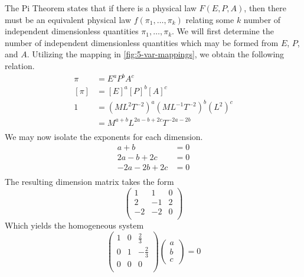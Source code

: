 \documentclass[12pt]{article}
\begin{document}
  The Pi Theorem states that if there is a physical law $F(E, P, A)$, then there
  must be an equivalent physical law $f(\pi_1, \ldots, \pi_k)$ relating some $k$
  number of independent dimensionless quantities $\pi_1,\ldots,\pi_k$. We will
  first determine the number of independent dimensionless quantities which may
  be formed from $E$, $P$, and $A$. Utilizing the mapping in
  \cref{fig:5-var-mappings}, we obtain the following relation.
  \begin{equation*}
    \begin{aligned}
      \pi &= {E}^a{P}^b{A}^c \\
      [\pi] &= {[E]}^a{[P]}^b{[A]}^c \\
      1 &= {(ML^2T^{-2})}^a{(ML^{-1}T^{-2})}^b{(L^2)}^c \\
      &= M^{a+b}L^{2a-b+2c}T^{-2a-2b} \\
    \end{aligned}
  \end{equation*}
  We may now isolate the exponents for each dimension.
  \begin{equation*}
    \begin{aligned}
      a + b &= 0 \\
      2a - b + 2c &= 0 \\
      -2a - 2b + 2c &= 0 \\
    \end{aligned}
  \end{equation*}
  The resulting dimension matrix takes the form
  \begin{equation*}
    \begin{pmatrix}
      1 & 1 & 0 \\
      2 & -1 & 2 \\
      -2 & -2 & 0 \\
    \end{pmatrix}
  \end{equation*}
  Which yields the homogeneous system
  \begin{equation*}
    \begin{pmatrix}
      1 & 0 & \frac{2}{3} \\
      0 & 1 & -\frac{2}{3} \\
      0 & 0 & 0 \\
    \end{pmatrix}
    \begin{pmatrix}
      a \\ b \\ c \
    \end{pmatrix} = 0
  \end{equation*}
\end{document}
